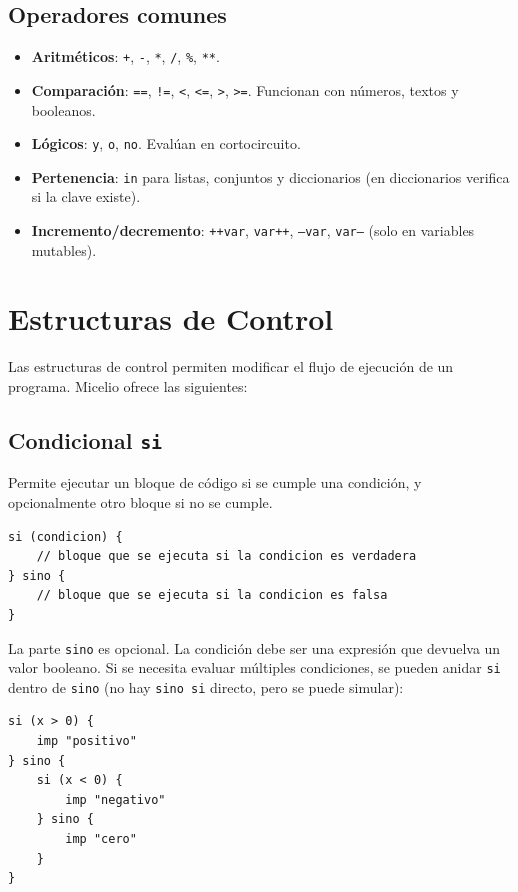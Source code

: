 \documentclass[12pt]{article}
\begin{document}
\subsection{Operadores comunes}
\begin{itemize}
    \item \textbf{Aritméticos}: \texttt{+}, \texttt{-}, \texttt{*}, \texttt{/}, \texttt{\%}, \texttt{**}.
    \item \textbf{Comparación}: \texttt{==}, \texttt{!=}, \texttt{<}, \texttt{<=}, \texttt{>}, \texttt{>=}. Funcionan con números, textos y booleanos.
    \item \textbf{Lógicos}: \texttt{y}, \texttt{o}, \texttt{no}. Evalúan en cortocircuito.
    \item \textbf{Pertenencia}: \texttt{in} para listas, conjuntos y diccionarios (en diccionarios verifica si la clave existe).
    \item \textbf{Incremento/decremento}: \texttt{++var}, \texttt{var++}, \texttt{--var}, \texttt{var--} (solo en variables mutables).
\end{itemize}

\section{Estructuras de Control}

Las estructuras de control permiten modificar el flujo de ejecución de un programa. Micelio ofrece las siguientes:

\subsection{Condicional \texttt{si}}
Permite ejecutar un bloque de código si se cumple una condición, y opcionalmente otro bloque si no se cumple.
\begin{lstlisting}
si (condicion) {
    // bloque que se ejecuta si la condicion es verdadera
} sino {
    // bloque que se ejecuta si la condicion es falsa
}
\end{lstlisting}
La parte \texttt{sino} es opcional. La condición debe ser una expresión que devuelva un valor booleano. Si se necesita evaluar múltiples condiciones, se pueden anidar \texttt{si} dentro de \texttt{sino} (no hay \texttt{sino si} directo, pero se puede simular):
\begin{lstlisting}
si (x > 0) {
    imp "positivo"
} sino {
    si (x < 0) {
        imp "negativo"
    } sino {
        imp "cero"
    }
}
\end{lstlisting}
\end{document}
